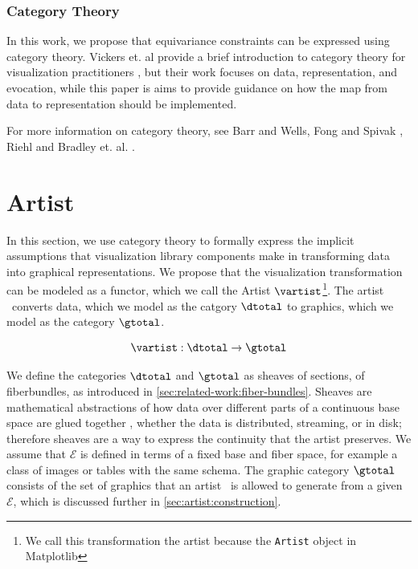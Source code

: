 \documentclass[10pt,journal,compsoc]{IEEEtran}
\theoremstyle{definition}
\theoremstyle{remark}
\begin{document}
\subsubsection{Category Theory}
\label{sec:related-work:equivariance:category}
In this work, we propose that equivariance constraints can be expressed using category theory. Vickers et. al provide a brief introduction to category theory for visualization practitioners \cite{vickersUnderstandingVisualizationFormal2013}, but their work focuses on data, representation, and evocation, while this paper is aims to provide guidance on how the map from data to representation should be implemented. 

For more information on category theory, see Barr and Wells\cite{barrCategoryTheoryComputing}, Fong and Spivak \cite{fongInvitationAppliedCategory2019}, Riehl\cite{riehlCategoryTheoryContext} and Bradley et. al. \cite{bradleyTopologyCategoricalApproach2020}.

\section{Artist} 
In this section, we use category theory to formally express the implicit assumptions that visualization library components make in transforming data into graphical representations. We propose that the visualization transformation can be modeled as a functor, which we call the \textcolor{artist}{Artist} $\mathcal{\vartist}$\footnote{We call this transformation the artist because the \texttt{Artist} object in Matplotlib\cite{hunterMatplotlib2DGraphics2007}}. The artist \vartist\ converts data, which we model as the catgory $\mathcal{\dtotal}$ to graphics, which we model as the category $\mathcal{\gtotal}$.

\begin{equation}
  \vartist: \mathcal{\dtotal} \rightarrow \mathcal{\gtotal}
  \label{eq:artist:artist}
\end{equation}

We define the categories $\mathcal{\dtotal}$ and $\mathcal{\gtotal}$ as sheaves of sections\cite{SheafMathematics2021,spanier1989algebraic}, of fiberbundles, as introduced in \autoref{sec:related-work:fiber-bundles}. Sheaves are mathematical abstractions of how data over different parts of a continuous base space are glued together \cite{ghristElementaryAppliedTopology2014, ghri}, whether the data is distributed, streaming, or in disk; therefore sheaves are a way to express the continuity that the artist preserves. 
We assume that $\mathcal{E}$ is defined in terms of a fixed base and fiber space, for example a class of images or tables with the same schema. The graphic category $\mathcal{\gtotal}$ consists of the set of graphics that an artist \vartist\ is allowed to generate from a given $\mathcal{E}$, which is discussed further in \autoref{sec:artist:construction}.
\end{document}
